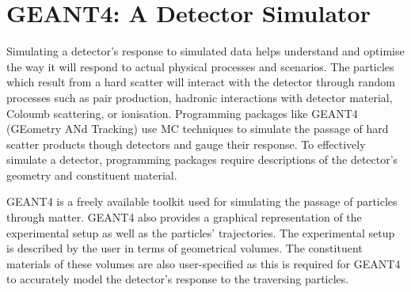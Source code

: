 \section{GEANT4: A Detector Simulator}
Simulating a detector's response to simulated data helps understand and optimise the way it will respond to actual physical processes and scenarios. The particles which result from a hard scatter will interact with the detector through random processes such as pair production, hadronic interactions with detector material, Coloumb scattering, or ionisation. Programming packages like GEANT4 (GEometry ANd Tracking) use MC techniques to simulate the passage of hard scatter products though detectors and gauge their response. To effectively simulate a detector, programming packages require descriptions of the detector's geometry and constituent material.

GEANT4 is a freely available toolkit used for simulating the passage of particles through matter. GEANT4 also provides a graphical representation of the experimental setup as well as the particles' trajectories. The experimental setup is described by the user in terms of geometrical volumes. The constituent materials of these volumes are also user-specified as this is required for GEANT4 to accurately model the detector's response to the traversing particles.

